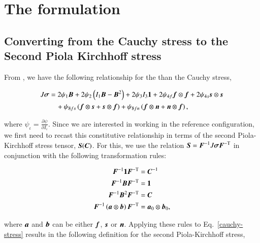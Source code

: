 \section{The formulation}
\label{formulation}

\subsection{Converting from the Cauchy stress to the Second Piola Kirchhoff stress}
\label{reformulating-stresses}

From \citep{Holzapfel:2009bb}, we have the following relationship for
the than the Cauchy stress,

\begin{equation}
  \begin{split}
    J\mbox{\boldmath$\sigma$} &=   2 \psi_{1} \mbox{\boldmath$ B$}
                + 2 \psi_{2} \left(I_{1} \mbox{\boldmath$ B$} - \mbox{\boldmath$ B$}^{2}\right)
                + 2 \psi_{3} I_{3} {\bf 1}
                + 2 \psi_{4f} \mbox{\boldmath$ f$}\otimes\mbox{\boldmath$ f$}
                + 2 \psi_{4s} \mbox{\boldmath$ s$}\otimes\mbox{\boldmath$ s$}\\
        &\quad  + \psi_{8fs} \left( \mbox{\boldmath$ f$}\otimes\mbox{\boldmath$ s$} + \mbox{\boldmath$ s$}\otimes\mbox{\boldmath$ f$} \right)
                + \psi_{8fn} \left( \mbox{\boldmath$ f$}\otimes\mbox{\boldmath$ n$} + \mbox{\boldmath$ n$}\otimes\mbox{\boldmath$ f$} \right),
  \end{split}
  \label{cauchy-stress}
\end{equation}

\noindent where $\psi_{\iota} = \frac{\partial \psi}{\partial
  I_{\iota}}$. Since we are interested in working in the reference
configuration, we first need to recast this constitutive relationship
in terms of the second Piola-Kirchhoff stress tensor, $\mbox{\boldmath$ S$}(\mbox{\boldmath$ C$})$. For
this, we use the relation $\mbox{\boldmath$ S$} = \mbox{\boldmath$ F$}^{-1} J \mbox{\boldmath$\sigma$} \mbox{\boldmath$ F$}^{-\mathrm{T}}$
in conjunction with the following transformation rules:

\begin{equation*}
  \begin{split}
    \mbox{\boldmath$ F$}^{-1} {\bf 1} \mbox{\boldmath$ F$}^{-\mathrm{T}} &= \mbox{\boldmath$ C$}^{-1}\\
    \mbox{\boldmath$ F$}^{-1} \mbox{\boldmath$ B$} \mbox{\boldmath$ F$}^{-\mathrm{T}} &= {\bf 1}\\
    \mbox{\boldmath$ F$}^{-1} \mbox{\boldmath$ B$}^{2} \mbox{\boldmath$ F$}^{-\mathrm{T}} &= \mbox{\boldmath$ C$}\\
    \mbox{\boldmath$ F$}^{-1} \left(\mbox{\boldmath$ a$}\otimes\mbox{\boldmath$ b$}\right) \mbox{\boldmath$ F$}^{-\mathrm{T}} &= \mbox{\boldmath$ a$}_{0} \otimes \mbox{\boldmath$ b$}_{0},
  \end{split}
\end{equation*}

\noindent where $\mbox{\boldmath$ a$}$ and $\mbox{\boldmath$ b$}$ can be either $\mbox{\boldmath$ f$}$, $\mbox{\boldmath$ s$}$ or
$\mbox{\boldmath$ n$}$. Applying these rules to Eq.~\ref{cauchy-stress} results in the
following definition for the second Piola-Kirchhoff stress,

